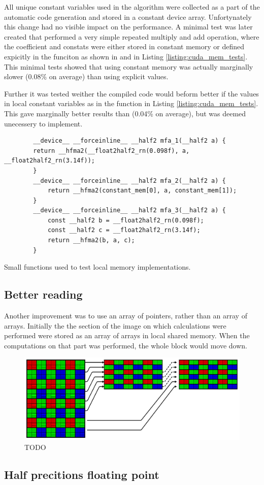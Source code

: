 All unique constant variables used in the algorithm were collected as a part of the automatic code generation and stored in a constant device array.
Unfortynately this change had no visible impact on the performance.
A minimal test was later created that performed a very simple repeated multiply and add operation, where the coefficient and constats were either stored in constant memory or defined expicitly in the funciton as shown in  and  in Listing \ref{listing:cuda_mem_tests}.
This minimal tests showed that using constant memory was actually marginally slower (0.08\% on average) than using explicit values.

Further it was tested weither the compiled code would beform better if the values in local constant variables as in the  function in Listing \ref{listing:cuda_mem_tests}.
This gave marginally better results than  (0.04\% on average), but was deemed unecessery to implement.

\begin{listing}[H]
    \begin{verbatim}
        __device__ __forceinline__ __half2 mfa_1(__half2 a) {
        return __hfma2(__float2half2_rn(0.098f), a, __float2half2_rn(3.14f));
        }
        __device__ __forceinline__ __half2 mfa_2(__half2 a) {
            return __hfma2(constant_mem[0], a, constant_mem[1]);
        }
        __device__ __forceinline__ __half2 mfa_3(__half2 a) {
            const __half2 b = __float2half2_rn(0.098f);
            const __half2 c = __float2half2_rn(3.14f);
            return __hfma2(b, a, c);
        }
    \end{verbatim}
    \caption{Small functions used to test local memory implementations.}
    \label{listing:cuda_mem_tests}
\end{listing}



\subsection{Better reading}
Another improvement was to use an array of pointers, rather than an array of arrays.
Initially the the section of the image on which calculations were performed were stored as an array of arrays in local shared memory.
When the computations on that part was performed, the whole block would move down.
\begin{figure}[H]
    \centering
    \includegraphics[width=\textwidth]{figures/polarized_image/read_line.pdf}
    \caption{TODO}
\end{figure}


\subsection{Half precitions floating point}